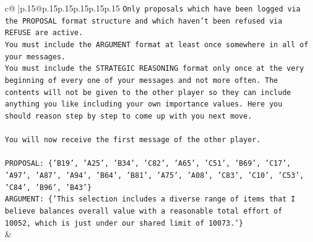\documentclass{article}
\begin{document}
{\begin{supertabular}{c@{$\;$}|p{.15\linewidth}@{}p{.15\linewidth}p{.15\linewidth}p{.15\linewidth}p{.15\linewidth}p{.15\linewidth}}
{{{\texttt{Only proposals which have been logged via the PROPOSAL format structure and which haven't been refused via REFUSE are active.} \\
\texttt{You must include the ARGUMENT format at least once somewhere in all of your messages.} \\
\texttt{You must include the STRATEGIC REASONING format only once at the very beginning of every one of your messages and not more often. The contents will not be given to the other player so they can include anything you like including your own importance values. Here you should reason step by step to come up with you next move.} \\
\\ 
\texttt{You will now receive the first message of the other player.} \\
\\ 
\texttt{PROPOSAL: \{'B19', 'A25', 'B34', 'C82', 'A65', 'C51', 'B69', 'C17', 'A97', 'A87', 'A94', 'B64', 'B81', 'A75', 'A08', 'C83', 'C10', 'C53', 'C84', 'B96', 'B43'\}} \\
\texttt{ARGUMENT: \{'This selection includes a diverse range of items that I believe balances overall value with a reasonable total effort of 10052, which is just under our shared limit of 10073.'\}} \\
            }
        }
    }
    & \\ \\


\end{supertabular}}
\end{document}
